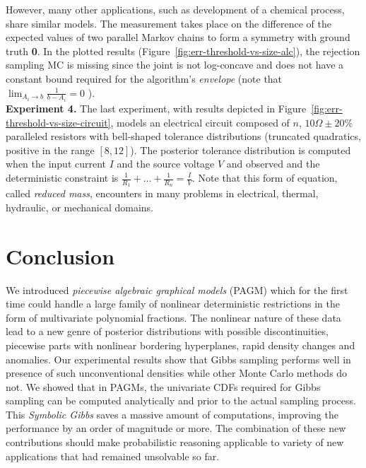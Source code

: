 \documentclass[letterpaper]{article}
\begin{document}
However, many other applications, such as development of a chemical process, share similar models.  
The measurement takes place on the difference of the expected values of two parallel Markov chains to form a symmetry with ground truth \textbf{0}.
In the plotted results (Figure~\ref{fig:err-threshold-vs-size-alc}), 
the rejection sampling MC is missing since the joint is not log-concave and does not have a constant bound required for the algorithm's \emph{envelope} 
(note that $\lim_{A_{i} \rightarrow b} \frac{1}{b - A_{i}} = 0$ ).
\\
\textbf{Experiment 4.} The last experiment, with results depicted in 
Figure~\ref{fig:err-threshold-vs-size-circuit}, models an electrical circuit composed of $n$, $10\Omega\pm20\%$ paralleled resistors with bell-shaped tolerance distributions (truncated quadratics, positive in the range $[8, 12]$). The posterior tolerance distribution is computed when 
the input current $I$ and the source voltage $V$ and observed and the deterministic constraint is $\frac{1}{R_1} + \ldots + \frac{1}{R_n} = \frac{I}{V}$.
Note that this form of equation, called \emph{reduced mass}, encounters in many problems in electrical, thermal, hydraulic, or mechanical domains. 
\section{Conclusion}
We introduced \emph{piecewise algebraic graphical models} (PAGM) 
which for the first time could handle a large family of nonlinear deterministic restrictions
in the form of multivariate polynomial fractions.
The nonlinear nature of these data lead to a new genre of  posterior distributions 
with possible discontinuities, 
piecewise parts with nonlinear bordering hyperplanes, 
rapid density changes and anomalies.
Our experimental results show that Gibbs sampling performs well in presence of such
unconventional densities while other Monte Carlo methods do not.
We showed that in PAGMs, the univariate CDFs required for Gibbs sampling can be computed analytically and prior to the actual sampling process. 
This \emph{Symbolic Gibbs} saves a massive amount of computations, 
improving the performance by an order of magnitude or more.
The combination of these new contributions should make probabilistic reasoning applicable to 
variety of new applications that had remained unsolvable so far.      






\end{document}
